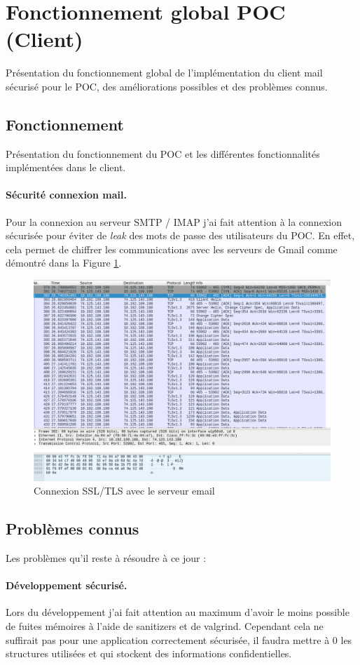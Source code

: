 \section{Fonctionnement global POC (Client)}
Présentation du fonctionnement global de l'implémentation du client mail sécurisé pour le POC, des améliorations possibles et des problèmes connus.
\subsection{Fonctionnement}
Présentation du fonctionnement du POC et les différentes fonctionnalités implémentées dans le client.
\paragraph*{Sécurité connexion mail.}
Pour la connexion au serveur SMTP / IMAP j'ai fait attention à la connexion sécurisée pour éviter de \textit{leak} des mots de passe des utilisateurs du POC. En effet, cela permet de chiffrer les communications avec les serveurs de Gmail comme démontré dans la Figure \ref{fig:securityProofEmail}.
\begin{figure}[h!]
	\centering
	\includegraphics[width=14cm]{images/packetProofEncrypted.png}
	\caption{Connexion SSL/TLS avec le serveur email}
	\label{fig:securityProofEmail}
\end{figure}
\subsection{Problèmes connus}
Les problèmes qu'il reste à résoudre à ce jour :
\paragraph*{Développement sécurisé.}
Lors du développement j'ai fait attention au maximum d'avoir le moins possible de fuites mémoires à l'aide de sanitizers et de valgrind. Cependant cela ne suffirait pas pour une application correctement sécurisée, il faudra mettre à 0 les structures utilisées et qui stockent des informations confidentielles.
